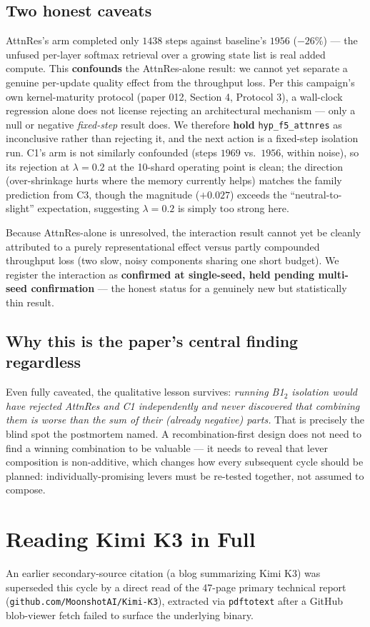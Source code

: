 \documentclass{article}
\begin{document}
\subsection{Two honest caveats}
AttnRes's arm completed only $1438$ steps against baseline's $1956$ ($-26\%$) --- the unfused per-layer softmax retrieval over a growing state list is real added compute. This \textbf{confounds} the AttnRes-alone result: we cannot yet separate a genuine per-update quality effect from the throughput loss. Per this campaign's own kernel-maturity protocol (paper 012, Section 4, Protocol 3), a wall-clock regression alone does not license rejecting an architectural mechanism --- only a null or negative \emph{fixed-step} result does. We therefore \textbf{hold} \texttt{hyp\_f5\_attnres} as inconclusive rather than rejecting it, and the next action is a fixed-step isolation run. C1's arm is not similarly confounded (steps $1969$ vs.\ $1956$, within noise), so its rejection at $\lambda=0.2$ at the 10-shard operating point is clean; the direction (over-shrinkage hurts where the memory currently helps) matches the family prediction from C3, though the magnitude ($+0.027$) exceeds the ``neutral-to-slight'' expectation, suggesting $\lambda=0.2$ is simply too strong here.

Because AttnRes-alone is unresolved, the interaction result cannot yet be cleanly attributed to a purely representational effect versus partly compounded throughput loss (two slow, noisy components sharing one short budget). We register the interaction as \textbf{confirmed at single-seed, held pending multi-seed confirmation} --- the honest status for a genuinely new but statistically thin result.

\subsection{Why this is the paper's central finding regardless}
Even fully caveated, the qualitative lesson survives: \emph{running B1$_2$ isolation would have rejected AttnRes and C1 independently and never discovered that combining them is worse than the sum of their (already negative) parts.} That is precisely the blind spot the postmortem named. A recombination-first design does not need to find a winning combination to be valuable --- it needs to reveal that lever composition is non-additive, which changes how every subsequent cycle should be planned: individually-promising levers must be re-tested together, not assumed to compose.

\section{Reading Kimi K3 in Full}
\label{sec:kimi}
An earlier secondary-source citation (a blog summarizing Kimi K3) was superseded this cycle by a direct read of the 47-page primary technical report (\texttt{github.com/MoonshotAI/Kimi-K3}), extracted via \texttt{pdftotext} after a GitHub blob-viewer fetch failed to surface the underlying binary.
\end{document}
